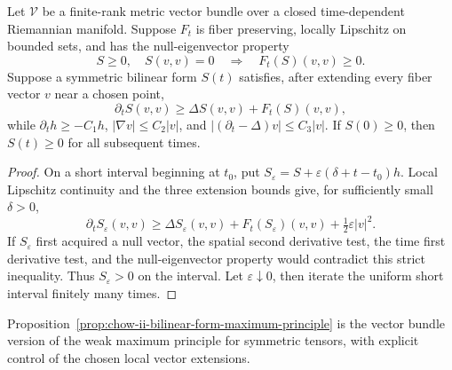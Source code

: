 \begin{proposition}
\label{prop:chow-ii-bilinear-form-maximum-principle}

Let \(\mathcal V\) be a finite-rank metric vector bundle over a closed
time-dependent Riemannian manifold.  Suppose \(F_t\) is fiber preserving,
locally Lipschitz on bounded sets, and has the null-eigenvector property
\[
S\ge0,\quad S(v,v)=0\quad\Longrightarrow\quad F_t(S)(v,v)\ge0.
\]
Suppose a symmetric bilinear form \(S(t)\) satisfies, after extending every
fiber vector \(v\) near a chosen point,
\[
\partial_tS(v,v)\ge\Delta S(v,v)+F_t(S)(v,v),
\]
while \(\partial_th\ge-C_1h\), \(|\nabla v|\le C_2|v|\), and
\(|(\partial_t-\Delta)v|\le C_3|v|\).  If \(S(0)\ge0\), then
\(S(t)\ge0\) for all subsequent times.
\end{proposition}
\begin{proof}
\sketch On a short interval beginning at \(t_0\), put
\(S_\varepsilon=S+\varepsilon(\delta+t-t_0)h\).  Local Lipschitz continuity
and the three extension bounds give, for sufficiently small \(\delta>0\),
\[
\partial_tS_\varepsilon(v,v)\ge\Delta S_\varepsilon(v,v)
+F_t(S_\varepsilon)(v,v)+\tfrac12\varepsilon|v|^2.
\]
If \(S_\varepsilon\) first acquired a null vector, the spatial second
derivative test, the time first derivative test, and the null-eigenvector
property would contradict this strict inequality.  Thus
\(S_\varepsilon>0\) on the interval.  Let \(\varepsilon\downarrow0\), then
iterate the uniform short interval finitely many times.
\end{proof}

\begin{remark}
\label{rem:chow-ii-bilinear-form-maximum-principle-comparison}

Proposition~\ref{prop:chow-ii-bilinear-form-maximum-principle} is the vector
bundle version of the weak maximum principle for symmetric tensors, with
explicit control of the chosen local vector extensions.
\end{remark}

